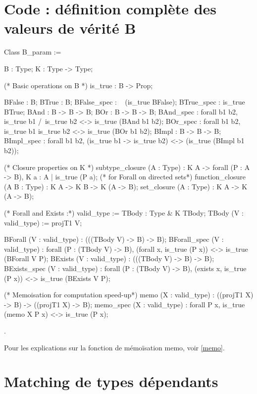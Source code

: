 \documentclass{article}
\newcommand\code[1]{{\fontfamily{lmtt}\selectfont #1}}
\theoremstyle{definition}
\begin{document}



\newpage

\appendix

\section{Code : définition complète des valeurs de vérité B}
\label{annexe}

\begin{coq}
Class B_param := { B : Type;
  K : Type -> Type;

  (* Basic operations on B *)
  is_true : B -> Prop;

  BFalse : B;
  BTrue : B;
  BFalse_spec : ~ (is_true BFalse);
  BTrue_spec : is_true BTrue;
  BAnd : B -> B -> B;
  BOr : B -> B -> B;
  BAnd_spec : forall b1 b2, is_true b1 /\ is_true b2 <-> is_true (BAnd b1 b2);
  BOr_spec : forall b1 b2, is_true b1 \/ is_true b2 <-> is_true (BOr b1 b2);
  BImpl : B -> B -> B;
  BImpl_spec : forall b1 b2, (is_true b1 -> is_true b2) <-> (is_true (BImpl b1 b2));

  (* Closure properties on K *)
  subtype_closure (A : Type) : K A -> forall (P : A -> B), K {a : A | is_true (P a)}; (* for Forall on directed sets*)
  function_closure (A B : Type) : K A -> K B -> K (A -> B);
  set_closure (A : Type) : K A -> K (A -> B);

  (* Forall and Exists :*)
  valid_type := { TBody : Type & K TBody};
  TBody (V : valid_type) := projT1 V;

  BForall (V : valid_type) : (((TBody V) -> B) -> B);
  BForall_spec (V : valid_type) : forall (P : (TBody V) -> B),
    (forall x, is_true (P x)) <-> is_true (BForall V P);
  BExists (V : valid_type) : (((TBody V) -> B) -> B);
  BExists_spec (V : valid_type) : forall (P : (TBody V) -> B),
    (exists x, is_true (P x)) <-> is_true (BExists V P);


  (* Memoisation for computation speed-up*)
  memo (X : valid_type) : ((projT1 X) -> B) -> ((projT1 X) -> B);
  memo_spec (X : valid_type) : forall P x, is_true (memo X P x) <-> is_true (P x);
  }.
\end{coq}


Pour les explications sur la fonction de mémoïsation \code{memo}, voir \ref{memo}.

\newpage

\section{Matching de types dépendants}
\label{dep}
\end{document}
